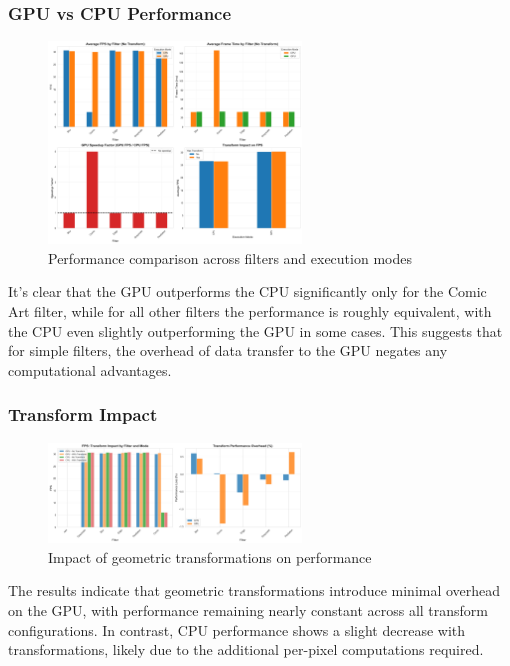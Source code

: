 \documentclass[12pt,a4paper]{article}
\begin{document}
\subsubsection{GPU vs CPU Performance}
\begin{figure}[H]
    \centering
    \includegraphics[width=0.6\textwidth]{../data/plots/performance_comparison_transforms.png}
    \caption{Performance comparison across filters and execution modes}
    \label{fig:transform_comparison}
\end{figure}
It's clear that the GPU outperforms the CPU significantly only for the Comic Art filter, while for all other filters the performance is roughly equivalent, with the CPU even slightly outperforming the GPU in some cases. This suggests that for simple filters, the overhead of data transfer to the GPU negates any computational advantages.

\subsubsection{Transform Impact}
\begin{figure}[H]
    \centering
    \includegraphics[width=0.6\textwidth]{../data/plots/transform_comparison.png}
    \caption{Impact of geometric transformations on performance}
    \label{fig:transform_impact}
\end{figure}
The results indicate that geometric transformations introduce minimal overhead on the GPU, with performance remaining nearly constant across all transform configurations. In contrast, CPU performance shows a slight decrease with transformations, likely due to the additional per-pixel computations required.
\end{document}
